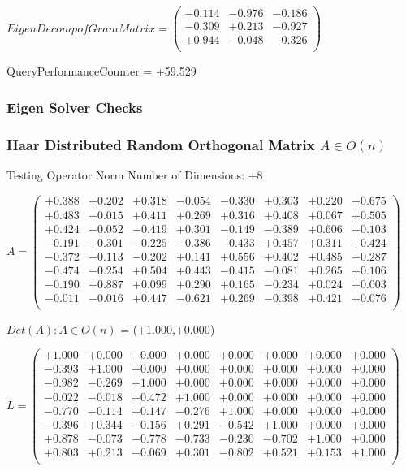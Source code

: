 \documentclass[9pt]{article}
\theoremstyle{plain}
\theoremstyle{definition}
\theoremstyle{remark}
\numberwithin{equation}{section}
\begin{document}
$EigenDecomp of Gram Matrix = \left(
\begin{array}{
ccc}
-0.114 & -0.976 & -0.186 \\
-0.309 & +0.213 & -0.927 \\
+0.944 & -0.048 & -0.326 \\
\end{array}
\right)$ \newline 

QueryPerformanceCounter  =  +59.529
\subsubsection{Eigen Solver Checks}
\subsubsection{Haar Distributed Random Orthogonal Matrix $A \in O(n)$}
 Testing Operator Norm
Number of Dimensions: +8

$A = \left(
\begin{array}{
cccccccc}
+0.388 & +0.202 & +0.318 & -0.054 & -0.330 & +0.303 & +0.220 & -0.675 \\
+0.483 & +0.015 & +0.411 & +0.269 & +0.316 & +0.408 & +0.067 & +0.505 \\
+0.424 & -0.052 & -0.419 & +0.301 & -0.149 & -0.389 & +0.606 & +0.103 \\
-0.191 & +0.301 & -0.225 & -0.386 & -0.433 & +0.457 & +0.311 & +0.424 \\
-0.372 & -0.113 & -0.202 & +0.141 & +0.556 & +0.402 & +0.485 & -0.287 \\
-0.474 & -0.254 & +0.504 & +0.443 & -0.415 & -0.081 & +0.265 & +0.106 \\
-0.190 & +0.887 & +0.099 & +0.290 & +0.165 & -0.234 & +0.024 & +0.003 \\
-0.011 & -0.016 & +0.447 & -0.621 & +0.269 & -0.398 & +0.421 & +0.076 \\
\end{array}
\right)$ \newline 

$Det(A) :   A \in O(n)$ = (+1.000,+0.000)

$L = \left(
\begin{array}{
cccccccc}
+1.000 & +0.000 & +0.000 & +0.000 & +0.000 & +0.000 & +0.000 & +0.000 \\
-0.393 & +1.000 & +0.000 & +0.000 & +0.000 & +0.000 & +0.000 & +0.000 \\
-0.982 & -0.269 & +1.000 & +0.000 & +0.000 & +0.000 & +0.000 & +0.000 \\
-0.022 & -0.018 & +0.472 & +1.000 & +0.000 & +0.000 & +0.000 & +0.000 \\
-0.770 & -0.114 & +0.147 & -0.276 & +1.000 & +0.000 & +0.000 & +0.000 \\
-0.396 & +0.344 & -0.156 & +0.291 & -0.542 & +1.000 & +0.000 & +0.000 \\
+0.878 & -0.073 & -0.778 & -0.733 & -0.230 & -0.702 & +1.000 & +0.000 \\
+0.803 & +0.213 & -0.069 & +0.301 & -0.802 & +0.521 & +0.153 & +1.000 \\
\end{array}
\right)$ \newline 
\end{document}
